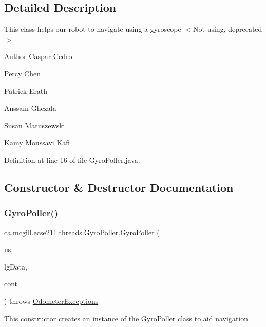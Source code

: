 \subsection{Detailed Description}
This class helps our robot to navigate using a gyroscope $<$Not using, deprecated$>$ \begin{DoxyAuthor}{Author}
Caspar Cedro 

Percy Chen 

Patrick Erath 

Anssam Ghezala 

Susan Matuszewski 

Kamy Moussavi Kafi 
\end{DoxyAuthor}


Definition at line 16 of file Gyro\+Poller.\+java.



\subsection{Constructor \& Destructor Documentation}
\mbox{\label{classca_1_1mcgill_1_1ecse211_1_1threads_1_1_gyro_poller_a1bab49cc19ee3b633ddbec4c408927bf}} 
\subsubsection{\texorpdfstring{Gyro\+Poller()}{GyroPoller()}}
{\footnotesize\ttfamily ca.\+mcgill.\+ecse211.\+threads.\+Gyro\+Poller.\+Gyro\+Poller (\begin{DoxyParamCaption}\item[{Sample\+Provider}]{us,  }\item[{float \mbox{[}$\,$\mbox{]}}]{lg\+Data,  }\item[{\hyperlink{classca_1_1mcgill_1_1ecse211_1_1threads_1_1_sensor_data}{Sensor\+Data}}]{cont }\end{DoxyParamCaption}) throws \hyperlink{classca_1_1mcgill_1_1ecse211_1_1odometer_1_1_odometer_exceptions}{Odometer\+Exceptions}}

This constructor creates an instance of the \hyperlink{classca_1_1mcgill_1_1ecse211_1_1threads_1_1_gyro_poller}{Gyro\+Poller} class to aid navigation


